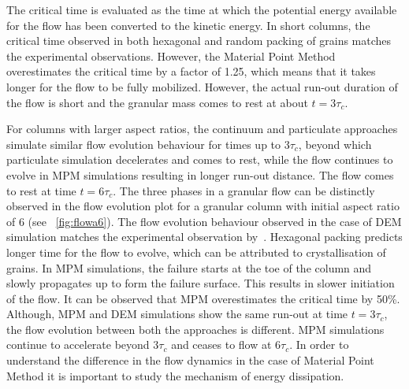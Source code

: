 The critical time is evaluated as the time at which the potential energy 
available for the flow has been converted to the kinetic energy. In short 
columns, the critical time observed in both hexagonal and random packing of 
grains matches the experimental observations. However, the Material Point 
Method overestimates the critical time by a factor of 1.25, which means that it 
takes longer for the flow to be fully mobilized. However, the actual run-out 
duration of the flow is short and the granular mass comes to rest at about 
$\textit{t}=3\tau_{c}$.
 
For columns with larger aspect ratios, the continuum and particulate approaches 
simulate similar flow evolution behaviour for times up to 3$\tau_{c}$, beyond 
which particulate simulation decelerates and comes to rest, while the flow 
continues to evolve in MPM simulations resulting in longer run-out distance. 
The flow comes to rest at time $\textit{t}=6\tau_{c}$. The 
three phases in a granular flow can be distinctly observed in the flow 
evolution plot for a granular column with initial aspect ratio of 6 (see 
~\cref{fig:flowa6}). The flow evolution 
behaviour observed in the case of DEM simulation matches the experimental 
observation by~\citet{Lajeunesse2004}. Hexagonal packing predicts longer time 
for the flow to evolve, which can be attributed to crystallisation of grains. 
In MPM simulations, the failure starts at the toe of the column and slowly 
propagates up to form the failure surface. This results in slower initiation of 
the flow. It can be observed that MPM overestimates the critical time by 50\%. 
Although, MPM and DEM simulations show the same run-out at time 
$\textit{t}=3\tau_{c}$, the flow evolution between both the approaches is 
different. MPM simulations continue to accelerate beyond $3\tau_c$ and ceases 
to flow at $6\tau_{c}$. In order to understand the difference in the flow 
dynamics in the case of Material Point Method it is important to study the 
mechanism of energy dissipation. 


